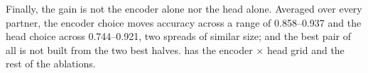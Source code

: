 Finally, the gain is not the encoder alone nor the head alone. Averaged over every partner, the
encoder choice moves \webtraffic{} accuracy across a range of 0.858--0.937 and the head choice across
0.744--0.921, two spreads of similar size; and the best pair of all is not built from the two best
halves.  has the encoder $\times$ head grid and the rest of the ablations.
